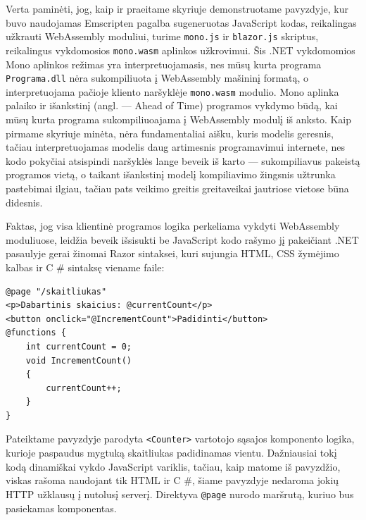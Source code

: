 \documentclass{VUMIFPSkursinis}
\begin{document}
Verta paminėti, jog, kaip ir praeitame skyriuje demonstruotame pavyzdyje, kur buvo naudojamas Emscripten pagalba sugeneruotas JavaScript kodas, reikalingas užkrauti WebAssembly moduliui, turime \verb|mono.js| ir \verb|blazor.js| skriptus, reikalingus vykdomosios \verb|mono.wasm| aplinkos užkrovimui. Šis .NET vykdomomios Mono aplinkos režimas yra interpretuojamasis, nes mūsų kurta programa \verb|Programa.dll| nėra sukompiliuota į WebAssembly mašininį formatą, o interpretuojama pačioje kliento naršyklėje \verb|mono.wasm| modulio. Mono aplinka palaiko ir išankstinį (angl. — Ahead of Time) programos vykdymo būdą, kai mūsų kurta programa sukompiliuoajama į WebAssembly modulį iš anksto. Kaip pirmame skyriuje minėta, nėra fundamentaliai aišku, kuris modelis geresnis, tačiau interpretuojamas modelis daug artimesnis programavimui internete, nes kodo pokyčiai atsispindi naršyklės lange beveik iš karto — sukompiliavus pakeistą programos vietą, o taikant išankstinį modelį kompiliavimo žingsnis užtrunka pastebimai ilgiau, tačiau pats veikimo greitis greitaveikai jautriose vietose būna didesnis.

Faktas, jog visa klientinė programos logika perkeliama vykdyti WebAssembly moduliuose, leidžia beveik išsisukti be JavaScript kodo rašymo jį pakeičiant .NET pasaulyje gerai žinomai Razor sintaksei, kuri sujungia HTML, CSS žymėjimo kalbas ir C \# sintaksę viename faile:

\begin{center}
\begin{small}
\begin{verbatim}
@page "/skaitliukas"
<p>Dabartinis skaicius: @currentCount</p>
<button onclick="@IncrementCount">Padidinti</button>
@functions {
    int currentCount = 0;
    void IncrementCount()
    {
        currentCount++;
    }
}
\end{verbatim}
\end{small}
\end{center}

Pateiktame pavyzdyje parodyta \verb|<Counter>| vartotojo sąsajos komponento logika, kurioje paspaudus mygtuką skaitliukas padidinamas vientu. Dažniausiai tokį kodą dinamiškai vykdo JavaScript variklis, tačiau, kaip matome iš pavyzdžio, viskas rašoma naudojant tik HTML ir C \#, šiame pavyzdyje nedaroma jokių HTTP užklausų į nutolusį serverį. Direktyva \verb|@page| nurodo maršrutą, kuriuo bus pasiekamas komponentas.
\end{document}
